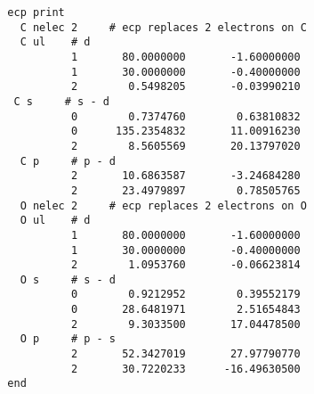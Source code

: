 
\begin{verbatim}
  ecp print  
    C nelec 2     # ecp replaces 2 electrons on C
    C ul    # d
            1       80.0000000       -1.60000000
            1       30.0000000       -0.40000000
            2        0.5498205       -0.03990210
   C s     # s - d 
            0        0.7374760        0.63810832
            0      135.2354832       11.00916230
            2        8.5605569       20.13797020
    C p     # p - d
            2       10.6863587       -3.24684280
            2       23.4979897        0.78505765
    O nelec 2     # ecp replaces 2 electrons on O
    O ul    # d 
            1       80.0000000       -1.60000000
            1       30.0000000       -0.40000000
            2        1.0953760       -0.06623814
    O s     # s - d
            0        0.9212952        0.39552179
            0       28.6481971        2.51654843
            2        9.3033500       17.04478500
    O p     # p - s 
            2       52.3427019       27.97790770
            2       30.7220233      -16.49630500
  end
\end{verbatim}


